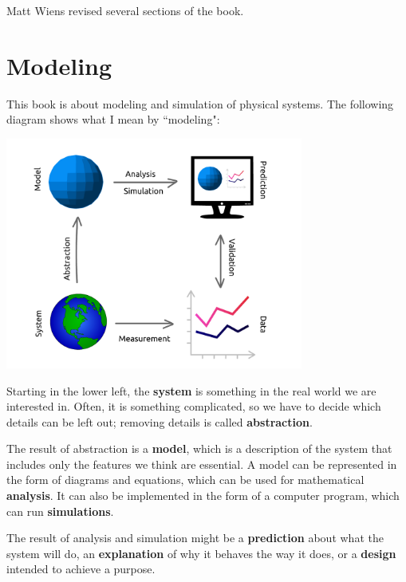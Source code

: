 \documentclass[
]{book}
\numberwithin{Answer}{chapter}
\numberwithin{Exercise}{chapter}
\begin{document}
Matt Wiens revised several sections of the book.

\newpage


\tableofcontents

\mainmatter

\chapter{Modeling}

This book is about modeling and simulation of physical systems.  
The following diagram shows what I mean by ``modeling":


\vspace{0.2in}
\centerline{\includegraphics[height=3in]{figs/modeling_framework.pdf}}

Starting in the lower left, the {\bf system} is something in the real world we are interested in.  Often, it is something complicated, so we have to decide which details can be left out; removing details is called {\bf abstraction}.


The result of abstraction is a {\bf model}, which is a description of the system that includes only the features we think are essential.  A model can be represented in the form of diagrams and equations, which can be used for mathematical {\bf analysis}.  It can also be implemented in the form of a computer program, which can run {\bf simulations}.


The result of analysis and simulation might be a {\bf prediction} about what the system will do, an {\bf explanation} of why it behaves the way it does, or a {\bf design} intended to achieve a purpose.
\end{document}
